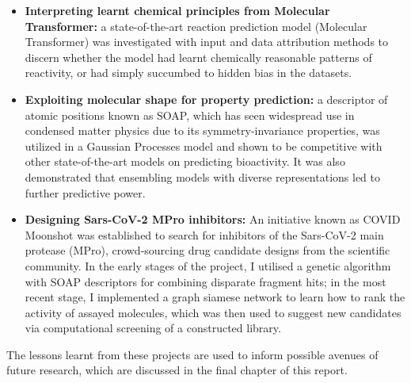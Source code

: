 \begin{itemize}
    \item \textbf{Interpreting learnt chemical principles from Molecular Transformer:} a state-of-the-art reaction prediction model (Molecular Transformer) was investigated with input and data attribution methods to discern whether the model had learnt chemically reasonable patterns of reactivity, or had simply succumbed to hidden bias in the datasets.
    \item \textbf{Exploiting molecular shape for property prediction:} a descriptor of atomic positions known as SOAP, which has seen widespread use in condensed matter physics due to its symmetry-invariance properties, was utilized in a Gaussian Processes model and shown to be competitive with other state-of-the-art models on predicting bioactivity. It was also demonstrated that ensembling models with diverse representations led to further predictive power.
    \item \textbf{Designing Sars-CoV-2 MPro inhibitors:} An initiative known as COVID Moonshot \cite{moonshot2020} was established to search for inhibitors of the Sars-CoV-2 main protease (MPro), crowd-sourcing drug candidate designs from the scientific community. In the early stages of the project, I utilised a genetic algorithm with SOAP descriptors for combining disparate fragment hits; in the most recent stage, I implemented a graph siamese network to learn how to rank the activity of assayed molecules, which was then used to suggest new candidates via computational screening of a constructed library.
\end{itemize}
The lessons learnt from these projects are used to inform possible avenues of future research, which are discussed in the final chapter of this report.